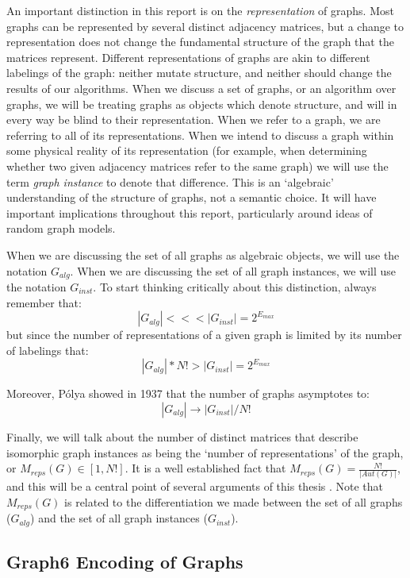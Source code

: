 An important distinction in this report is on the \emph{representation} of graphs.
Most graphs can be represented by several distinct adjacency matrices, but a change to representation does not change the fundamental structure of the graph that the matrices represent.
Different representations of graphs are akin to different labelings of the graph: neither mutate structure, and neither should change the results of our algorithms.
When we discuss a set of graphs, or an algorithm over graphs, we will be treating graphs as objects which denote structure, and will in every way be blind to their representation.
When we refer to a graph, we are referring to all of its representations.
When we intend to discuss a graph within some physical reality of its representation (for example, when determining whether two given adjacency matrices refer to the same graph) we will use the term \emph{graph instance} to denote that difference.
This is an `algebraic' understanding of the structure of graphs, not a semantic choice. 
It will have important implications throughout this report, particularly around ideas of random graph models.

When we are discussing the set of all graphs as algebraic objects, we will use the notation $G_{alg}$.
When we are discussing the set of all graph instances, we will use the notation $G_{inst}$.
To start thinking critically about this distinction, always remember that:
$$|G_{alg}| <<< |G_{inst}| = 2^{E_{max}}$$
but since the number of representations of a given graph is limited by its number of labelings that:
$$|G_{alg}| * N! > | G_{inst} | =  2^{E_{max}}$$

Moreover, P\'olya showed in 1937 \cite{polya} that the number of graphs asymptotes to:
$$|G_{alg}| \rightarrow |G_{inst}| / N!$$

Finally, we will talk about the number of distinct matrices that describe isomorphic graph instances as being the `number of representations' of the graph, or $M_{reps}(G) \in [1, N!]$.
It is a well established fact that $M_{reps}(G) = \frac{N!}{ | Aut(G) |}$, and this will be a central point of several arguments of this thesis \cite{adjmat}.
Note that  $M_{reps}(G)$ is related to the differentiation we made between the set of all graphs ($G_{alg}$) and the set of all graph instances ($G_{inst}$).

\subsection{Graph6 Encoding of Graphs}

